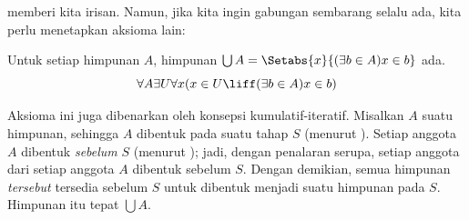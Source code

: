 \documentclass[../../../include/open-logic-section]{subfiles}
\begin{document}

 memberi kita irisan. Namun, jika
kita ingin gabungan sembarang selalu ada, kita perlu menetapkan aksioma lain:

\begin{axiom}[Gabungan] Untuk setiap himpunan $A$, himpunan
$\bigcup A = \Setabs{x}{(\exists b \in A) x \in b}$ ada.
\[
	\forall A \exists U \forall x(x \in U \liff (\exists b \in A)x \in b)
\]
\end{axiom}

Aksioma ini juga dibenarkan oleh konsepsi kumulatif-iteratif. Misalkan $A$
suatu himpunan, sehingga $A$ dibentuk pada suatu tahap $S$ (menurut
\stageshier). Setiap anggota $A$ dibentuk \emph{sebelum} $S$ (menurut
\stagesacc); jadi, dengan penalaran serupa, setiap anggota dari setiap anggota
$A$ dibentuk sebelum $S$. Dengan demikian, semua himpunan \emph{tersebut}
tersedia sebelum $S$ untuk dibentuk menjadi suatu himpunan pada $S$. Himpunan
itu tepat $\bigcup A$.
\end{document}
